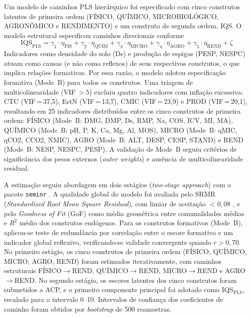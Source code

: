 \documentclass[pdflatex,sn-basic]{sn-jnl}%
\begin{document}
Um modelo de caminhos PLS hierárquico foi especificado com cinco construtos latentes de primeira ordem (FÍSICO, QUÍMICO, MICROBIOLÓGICO, AGRONÔMICO e RENDIMENTO) e um construto de segunda ordem, IQS. O modelo estrutural especificou caminhos direcionais conforme
\begin{equation}
\text{IQS}_{\text{PLS}} = \gamma_1 \cdot \eta_{\text{FIS}} + \gamma_2 \cdot \eta_{\text{QUIM}} + \gamma_3 \cdot \eta_{\text{MICRO}} + \gamma_4 \cdot \eta_{\text{AGRO}} + \gamma_5 \cdot \eta_{\text{REND}} + \zeta
\label{eq:plssem}
\end{equation}
Indicadores como densidade do solo (Ds) e produção de espigas (PESP, NESPC) atuam como causas (e não como reflexos) de seus respectivos construtos, o que implica relações formativas. Por essa razão, o modelo adotou especificação formativa (Mode~B) para todos os construtos. Uma triagem de multicolinearidade (VIF\,$> 5$) excluiu quatro indicadores com inflação excessiva: CTC (VIF\,=\,37,5), EstN (VIF\,=\,13,7), CMIC (VIF\,=\,23,9) e PROD (VIF\,=\,20,1), resultando em 25 indicadores distribuídos entre os cinco construtos de primeira ordem: FÍSICO (Mode~B: DMG, DMP, Ds, RMP, Na, COS, ICV, MI, MA), QUÍMICO (Mode~B: pH, P, K, Ca, Mg, Al, MOS), MICRO (Mode~B: qMIC, qCO2, CCO2, NMIC), AGRO (Mode~B: ALT, DESP, CESP, STAND) e REND (Mode~B: NESP, NESPC, PESP). A validação de Mode~B seguiu critérios de significância dos pesos externos (\textit{outer weights}) e ausência de multicolinearidade residual.

A estimação seguiu abordagem em dois estágios (\textit{two-stage approach}) com o pacote \texttt{seminr} \citep{Ray2022}. A qualidade global do modelo foi avaliada pelo SRMR (\textit{Standardized Root Mean Square Residual}), com limiar de aceitação $< 0{,}08$ \citep{Hair2019}, e pelo \textit{Goodness of Fit} (GoF) como média geométrica entre comunalidades médias e $R^2$ médio dos construtos endógenos. Para os construtos formativos (Mode~B), aplicou-se teste de redundância por correlação entre o escore formativo e um indicador global reflexivo, verificando-se validade convergente quando $r > 0{,}70$. No primeiro estágio, os cinco construtos de primeira ordem (FÍSICO, QUÍMICO, MICRO, AGRO, REND) foram estimados iterativamente, com caminhos estruturais FÍSICO$\to$REND, QUÍMICO$\to$REND, MICRO$\to$REND e AGRO$\to$REND. No segundo estágio, os escores latentes dos cinco construtos foram submetidos a ACP, e o primeiro componente principal foi adotado como IQS$_{\text{PLS}}$, escalado para o intervalo 0--10. Intervalos de confiança dos coeficientes de caminho foram obtidos por \textit{bootstrap} de 500 reamostras.
\end{document}
